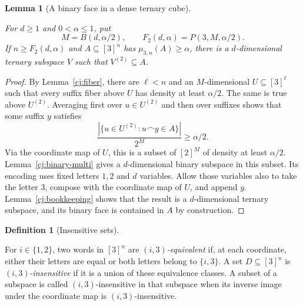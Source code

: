 \documentclass[11pt]{amsart}
\newtheorem{lemma}[theorem]{Lemma}
\theoremstyle{definition}
\newtheorem{definition}[theorem]{Definition}
\theoremstyle{remark}
\numberwithin{equation}{section}
\providecommand{\lean}[1]{}
\providecommand{\leanok}{}
\begin{document}
\begin{lemma}[A binary face in a dense ternary cube]\label{cj:binary-face}
\lean{Auto.C_cj_binary_face,Auto.cj_binary_face}
\leanok
For $d\ge1$ and $0<\alpha\le1$, put
\[
 M=B(d,\alpha/2),\qquad
 F_2(d,\alpha)=P(3,M,\alpha/2).
\]
If $n\ge F_2(d,\alpha)$ and $A\subseteq[3]^n$ has
$\mu_{3,n}(A)\ge\alpha$, there is a $d$-dimensional ternary
subspace $V$ such that $V^{(2)}\subseteq A$.
\end{lemma}
\begin{proof}
By Lemma~\ref{cj:fiber}, there are $\ell<n$ and an
$M$-dimensional $U\subseteq[3]^\ell$ such that every suffix fiber
above $U$ has density at least $\alpha/2$.  The same is true above
$U^{(2)}$.  Averaging first over $u\in U^{(2)}$ and then over suffixes
shows that some suffix $y$ satisfies
\[
 \frac{|\{u\in U^{(2)}:u\frown y\in A\}|}{2^M}\ge\alpha/2.
\]
Via the coordinate map of $U$, this is a subset of $[2]^M$ of density
at least $\alpha/2$.  Lemma~\ref{cj:binary-multi} gives a
$d$-dimensional binary subspace in this subset.  Its encoding uses
fixed letters $1,2$ and $d$ variables.  Allow those variables also
to take the letter $3$, compose with the coordinate map of $U$, and
append $y$.  Lemma~\ref{cj:bookkeeping} shows that the result is a
$d$-dimensional ternary subspace, and its binary face is contained
in $A$ by construction.
\end{proof}

\begin{definition}[Insensitive sets]\label{cj:insensitive}
\lean{Auto.InsEquiv,Auto.IsInsensitive,Auto.IsInsensitiveIn}
For $i\in\{1,2\}$, two words in $[3]^n$ are
\emph{$(i,3)$-equivalent} if, at each coordinate, either their letters
are equal or both letters belong to $\{i,3\}$.  A set
$D\subseteq[3]^n$ is \emph{$(i,3)$-insensitive} if it is a union of
these equivalence classes.  A subset of a subspace is called
$(i,3)$-insensitive in that subspace when its inverse image under the
coordinate map is $(i,3)$-insensitive.
\end{definition}
\end{document}
